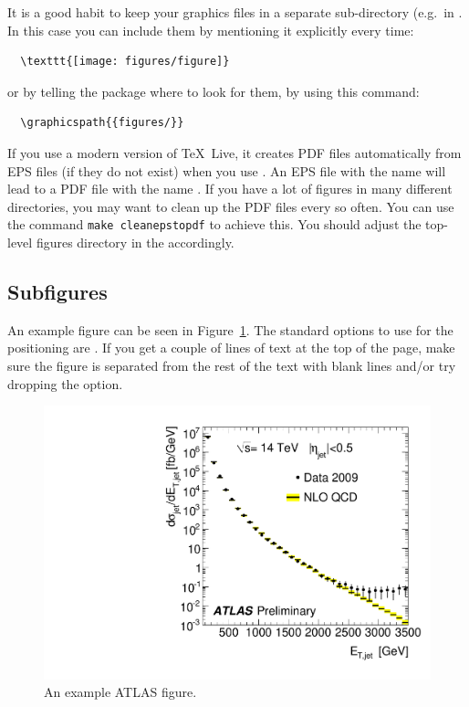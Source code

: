 It is a good habit to keep your graphics files in a separate
sub-directory (e.g.\ in . 
In this case you can include them by mentioning it explicitly every time:
\begin{verbatim}
  \texttt{[image: figures/figure]}
\end{verbatim}
or by telling the  package where to look
for them, by using this command:
\begin{verbatim}
  \graphicspath{{figures/}}
\end{verbatim}

If you use a modern version of \TeX\ Live, it creates PDF files automatically from EPS files
(if they do not exist) when you use .
An EPS file with the name  will lead to a PDF file with the name
.
If you have a lot of figures in many different directories, you may want to clean up the PDF files every so often.
You can use the command \verb|make cleanepstopdf| to achieve this.
You should adjust the top-level figures directory in the  accordingly.


\subsection{Subfigures}

An example figure can be seen in Figure~\ref{fig:example}.
The standard options to use for the positioning are .
If you get a couple of lines of text at the top of the page,
make sure the figure is separated from the rest of the text with blank lines and/or try dropping the  option.

\begin{figure}[htbp]
  \centering
  \includegraphics[width=0.5\columnwidth]{AtlasExample}
  \caption{An example ATLAS figure.}
  \label{fig:example}
\end{figure}

